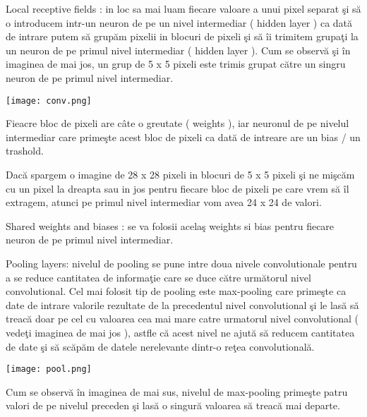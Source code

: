 \par

Local receptive fields : in loc sa mai luam fiecare valoare a unui pixel separat \c{s}i s\u{a} o introducem intr-un neuron de pe un nivel intermediar ( hidden layer ) ca dat\u{a} de intrare putem s\u{a} grup\u{a}m pixelii in blocuri de pixeli \c{s}i s\u{a} \^{i}i trimitem grupa\c{t}i la un neuron de pe primul nivel intermediar ( hidden layer ).   Cum se observ\u{a} \c{s}i \^{i}n imaginea de mai jos, un grup de 5 x 5 pixeli este trimis grupat c\u{a}tre un singru neuron de pe primul nivel intermediar.

\texttt{[image: conv.png]}

Fieacre bloc de pixeli are c\^{a}te o greutate ( weights ), iar neuronul de pe nivelul intermediar care prime\c{s}te acest bloc de pixeli ca dat\u{a} de intreare are un bias / un trashold.

\par

Dac\u{a} spargem o imagine de 28 x 28 pixeli in blocuri de 5 x 5 pixeli \c{s}i ne mi\c{s}c\u{a}m cu un pixel la dreapta sau in jos pentru fiecare bloc de pixeli pe care vrem s\u{a} \^{i}l extragem, atunci pe primul nivel intermediar vom avea 24 x 24 de valori.

\par

Shared weights and biases : se va folosii acela\c{s} weights si bias pentru fiecare neuron de pe primul nivel intermediar.

\par

Pooling layers: nivelul de pooling se pune intre doua nivele convolutionale pentru a se reduce cantitatea de informa\c{t}ie care se duce c\u{a}tre urm\u{a}torul nivel convolutional. Cel mai folosit tip de pooling este max-pooling care prime\c{s}te ca date de intrare valorile rezultate de la precedentul nivel convolutional \c{s}i le las\u{a} s\u{a} treac\u{a} doar pe cel cu valoarea cea mai mare catre urmatorul nivel convolutional ( vede\c{t}i imaginea de mai jos ), astfle c\u{a} acest nivel ne ajut\u{a} s\u{a} reducem cantitatea de date \c{s}i s\u{a} sc\u{a}p\u{a}m de datele nerelevante dintr-o re\c{t}ea convolutional\u{a}.

\texttt{[image: pool.png]}

Cum se observ\u{a} \^{i}n imaginea de mai sus, nivelul de max-pooling prime\c{s}te patru valori de pe nivelul preceden \c{s}i las\u{a} o singur\u{a} valoarea s\u{a} treac\u{a} mai departe.
